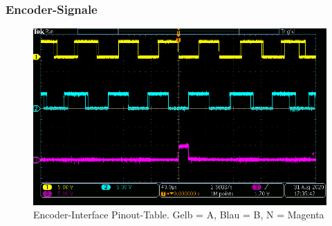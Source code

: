 \subsubsection{Encoder-Signale}\label{Appendix:ABN_Signale}

\begin{figure}[H]
	\centering
	\includegraphics[width=\textwidth]{graphics/AMT322S-V_Signal}
	\caption{Encoder-Interface Pinout-Table. Gelb = A, Blau = B, N = Magenta}
	\label{fig:AMT322S-V_Signal}
\end{figure}
